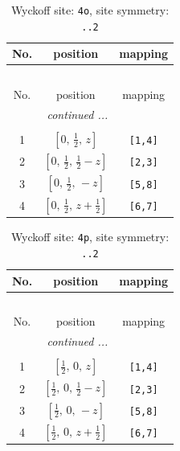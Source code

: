 \documentclass[fleqn,8pt]{jsarticle}
\begin{document}
\renewcommand{\arraystretch}{1.2}
\begin{longtable}{ccc}
\caption{Wyckoff site: {\tt 4o}, site symmetry: {\tt ..2}}
 \\
 \hline \hline
No. & position & mapping \\ \hline \endfirsthead

\multicolumn{2}{l}{\tablename\ \thetable{}} \\
 \hline \hline
No. & position & mapping \\ \hline \endhead

 \hline \hline
\multicolumn{2}{r}{\footnotesize\it continued ...} \\ \endfoot

 \hline \hline
\multicolumn{2}{r}{} \\ \endlastfoot

1 & $\left[ 0,\, \frac{1}{2},\, z \right]$ & {\tt [1,4]} \\ \hline
2 & $\left[ 0,\, \frac{1}{2},\, \frac{1}{2} - z \right]$ & {\tt [2,3]} \\ \hline
3 & $\left[ 0,\, \frac{1}{2},\, - z \right]$ & {\tt [5,8]} \\ \hline
4 & $\left[ 0,\, \frac{1}{2},\, z + \frac{1}{2} \right]$ & {\tt [6,7]} \\
\end{longtable}
\renewcommand{\arraystretch}{1.2}
\begin{longtable}{ccc}
\caption{Wyckoff site: {\tt 4p}, site symmetry: {\tt ..2}}
 \\
 \hline \hline
No. & position & mapping \\ \hline \endfirsthead

\multicolumn{2}{l}{\tablename\ \thetable{}} \\
 \hline \hline
No. & position & mapping \\ \hline \endhead

 \hline \hline
\multicolumn{2}{r}{\footnotesize\it continued ...} \\ \endfoot

 \hline \hline
\multicolumn{2}{r}{} \\ \endlastfoot

1 & $\left[ \frac{1}{2},\, 0,\, z \right]$ & {\tt [1,4]} \\ \hline
2 & $\left[ \frac{1}{2},\, 0,\, \frac{1}{2} - z \right]$ & {\tt [2,3]} \\ \hline
3 & $\left[ \frac{1}{2},\, 0,\, - z \right]$ & {\tt [5,8]} \\ \hline
4 & $\left[ \frac{1}{2},\, 0,\, z + \frac{1}{2} \right]$ & {\tt [6,7]} \\
\end{longtable}
\end{document}
